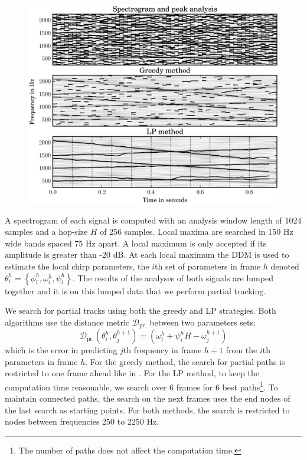 \begin{figure}[!t]
    \centering
    \includegraphics[width=\figwidthscale\textwidth]{plots/mq_lp_compare_chirp_10.eps}
\end{figure}

A spectrogram of each signal is computed with an analysis window length of 1024
samples and a hop-size $H$ of 256 samples. Local maxima are searched in 150 Hz
wide bands spaced 75 Hz apart. A local maximum is only accepted if its amplitude
is greater than -20 dB. At each local maximum the DDM is used to estimate the
local chirp parameters, the $i$th set of parameters in frame $h$ denoted
$\theta_{i}^{h} = \left\{ \phi_{i}^{h} , \omega_{i}^{h} , \psi_{i}^{h}
\right\}$. The results of the analyses of both signals are lumped together and
it is on this lumped data that we perform partial tracking.

We search for partial tracks using both the greedy and LP strategies. Both
algorithms use the distance metric $\mathcal{D}_{\text{pr.}}$ between two parameters sets:
\[
    \mathcal{D}_{\text{pr.}} \left( \theta_{i}^{h},
    \theta_{j}^{h+1} \right) = \left( \omega_{i}^{h} +
    \psi_{i}^{h} H - \omega_{j}^{h+1} \right)
\]
which is the error in predicting $j$th frequency in frame $h+1$ from the $i$th
parameters in frame $h$. For the greedy method, the search for partial paths is
restricted to one frame ahead like in \cite{mcaulay1986speech}. For the LP
method, to keep the computation time reasonable, we search over 6 frames for 6
best paths\footnote{The number of paths does not affect the computation time.}.
To maintain connected paths, the search on the next frames uses the end nodes of
the last search as starting points. For both methods, the search is restricted
to nodes between frequencies 250 to 2250 Hz.

